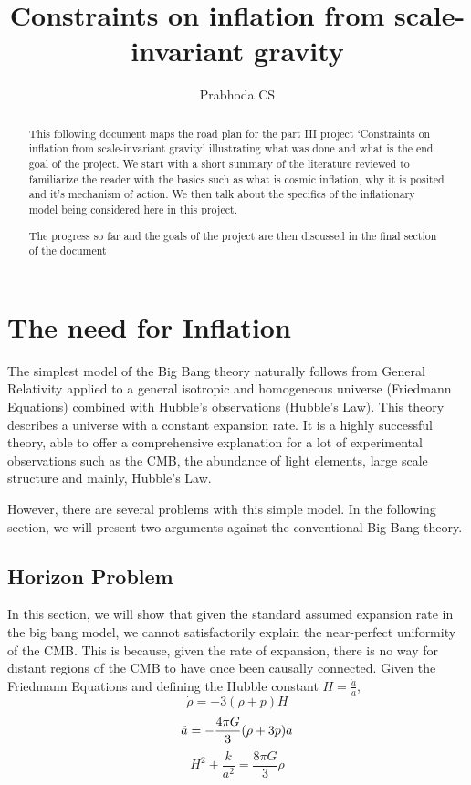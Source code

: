 \documentclass[aps,prd,reprint,preprintnumbers,showpacs,floatfix,nofootinbib,superscript address]{revtex4-2}
\begin{document}
\title{Constraints on inflation from scale-invariant gravity}

\author{Prabhoda CS}

\begin{abstract}
This following document maps the road plan for the part III project `Constraints on inflation from scale-invariant gravity' illustrating what was done and what is the end goal of the project. We start with a short summary of the literature reviewed to familiarize the reader with the basics such as what is cosmic inflation, why it is posited and it's mechanism of action. We then talk about the specifics of the inflationary model being considered here in this project. 

The progress so far and the goals of the project are then discussed in the final section of the document

\end{abstract}

\maketitle


\section{The need for Inflation}\label{The need for Inflation}

\indent The simplest model of the Big Bang theory naturally follows from General Relativity applied to a general isotropic and homogeneous universe (Friedmann Equations) combined with Hubble's observations (Hubble's Law). This theory describes a universe with a constant expansion rate. It is a highly successful theory, able to offer a comprehensive explanation for a lot of experimental observations such as the CMB, the abundance of light elements, large scale structure and mainly, Hubble's Law.

However, there are several problems with this simple model. In the following section, we will present two arguments against the conventional Big Bang theory.

\subsection{Horizon Problem}
In this section, we will show that given the standard assumed expansion rate in the big bang model, we cannot satisfactorily explain the near-perfect uniformity of the CMB. This is because, given the rate of expansion, there is no way for distant regions of the CMB to have once been causally connected.
Given the Friedmann Equations and defining the Hubble constant $H = \frac{\dot{a}}{a}$,
\begin{equation} \label{1}
    \dot{\rho} = -3(\rho + p)H
\end{equation}
\begin{equation} \label{2}
    \Ddot{a} = -\frac{4\pi G}{3} (\rho + 3p)a
\end{equation}
\begin{equation}    \label{3}
    H^2 + \frac{k}{a^2} = \frac{8 \pi G}{3} \rho
\end{equation}
\end{document}
